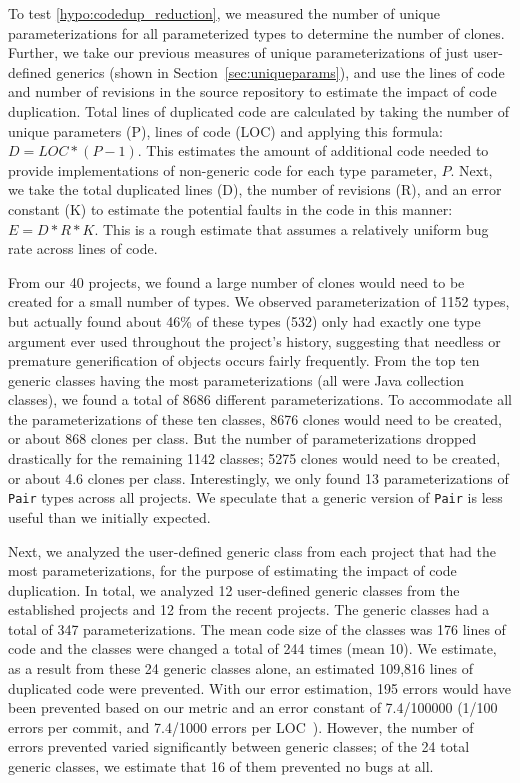 \documentclass{svjour3}
\newcommand{\code}[1]{\texttt{#1}}
\begin{document}
To test \autoref{hypo:codedup_reduction}, we measured the number of unique
parameterizations for all parameterized types to determine the number of
clones.  Further, we take our previous measures of unique parameterizations of
just user-defined generics (shown in Section~\ref{sec:uniqueparams}), and use the
lines of code and number of revisions in the source repository to estimate the
impact of code duplication.  
Total lines of duplicated code are calculated by
taking the number of unique parameters (P), lines of code (LOC)
and applying this formula: $D = LOC *  (P - 1)$.  This estimates the
amount of additional code needed to provide implementations of non-generic code for each
type parameter, $P$.
Next, we take the total
duplicated lines (D), the number of revisions (R), and an error constant (K) to
estimate the potential faults in the code in this manner: $E = D * R * K$.  This is a
rough estimate that assumes a relatively uniform bug rate across lines of code.

From our 40 projects, we found a large number of clones would need to be created for a small number of types.
We observed parameterization of 1152 types, but actually found about 
46\% of these types (532) only had exactly one type argument ever used
throughout the project's history, 
suggesting that needless or premature generification of objects occurs fairly frequently.
From the top ten generic classes having the most parameterizations (all were Java collection classes), we found a total of 8686 different parameterizations.
To accommodate all the parameterizations of these ten classes, 8676 clones would need to be created, or about 868 clones per class.  
But the number of parameterizations dropped drastically for the remaining 1142 classes; 5275
 clones would need to be created, or about 4.6 clones per class.  
Interestingly, we only found 13 parameterizations of \code{Pair} types across all projects.
We speculate that a generic version of \code{Pair} is less useful than we
initially expected.

Next, we analyzed the user-defined generic class from 
each project that had the most parameterizations,
for the purpose of estimating the impact of code duplication.
In total, we analyzed 12 user-defined generic classes from
the established projects and 12 from the recent projects.
The generic classes had a total of 347 parameterizations.  
The mean code size of the classes was 176 lines of code and the classes 
were changed a total of 244 times (mean 10).
We estimate, as a result from these 24 generic classes alone, an estimated 109,816 lines of duplicated code were prevented.  
With our error estimation, 195 errors would have been prevented based on our metric and an error constant of 7.4/100000 
(1/100 errors per commit, and 7.4/1000 errors per LOC~\cite{Humphrey:1995}).
However, the number of errors prevented varied significantly between 
generic classes; of the 24 total generic classes, 
we estimate that 16 of them prevented no bugs at all.
\end{document}

